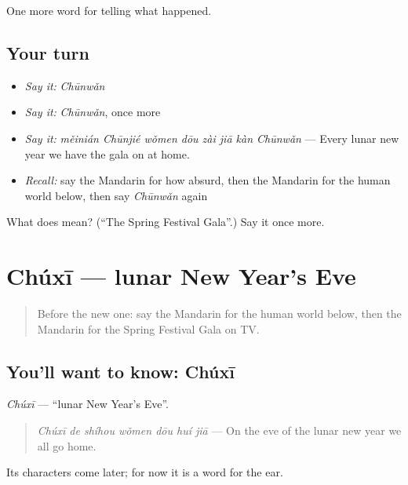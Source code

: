 \begin{grammarlens}[title={What you've built}]
One more word for telling what happened.
\end{grammarlens}

\subsection*{Your turn}
\begin{itemize}
\raggedright
  \item \emph{Say it:} \emph{Chūnwǎn}
  \item \emph{Say it:} \emph{Chūnwǎn}, once more
  \item \emph{Say it:} \emph{měinián Chūnjié wǒmen dōu zài jiā kàn Chūnwǎn} — Every lunar new year we have the gala on at home.
  \item \emph{Recall:} say the Mandarin for how absurd, then the Mandarin for the human world below, then say \emph{Chūnwǎn} again
\end{itemize}

\begin{tcolorbox}[breakable,colback=teal!4,colframe=teal!35!black,title={Before you move on}]
What does  mean? (\textquotedblleft{}The Spring Festival Gala\textquotedblright{}.) Say it once more.
\end{tcolorbox}
\section[Chúxī]{Chúxī — lunar New Year's Eve}

\label{lesson:ZH-C333-chuxi}



\begin{quote}
Before the new one: say the Mandarin for the human world below, then the Mandarin for the Spring Festival Gala on TV.
\end{quote}

\subsection*{You'll want to know: Chúxī}
\emph{Chúxī} — \textquotedblleft{}lunar New Year's Eve\textquotedblright{}.

\begin{quote}
\emph{Chúxī de shíhou wǒmen dōu huí jiā} — On the eve of the lunar new year we all go home.
\end{quote}

Its characters come later; for now it is a word for the ear.

